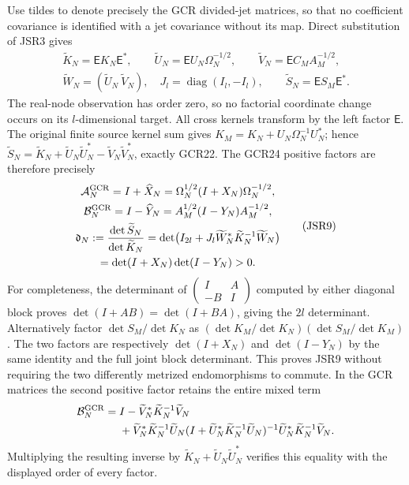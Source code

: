 \documentclass[11pt,a4paper]{article}
\newcommand{\diag}{\operatorname{diag}}
\begin{document}
Use tildes to denote precisely the GCR divided-jet matrices,
so that no coefficient covariance is identified with a jet
covariance without its map. Direct substitution of JSR3 gives
\[
\begin{gathered}
 \widetilde K_N=\mathsf E K_N\mathsf E^*,\qquad
 \widetilde U_N=\mathsf E U_N\Omega_N^{-1/2},\qquad
 \widetilde V_N=\mathsf E C_MA_M^{-1/2},\\
 \widetilde W_N=(\widetilde U_N\ \widetilde V_N),\quad
 J_l=\diag(I_l,-I_l),\qquad
 \widetilde S_N=\mathsf E S_M\mathsf E^*.
\end{gathered}\tag{JSR8}
\]
The real-node observation has order zero, so no factorial
coordinate change occurs on its $l$-dimensional target.
All cross kernels transform by the left factor $\mathsf E$.
The original finite source kernel sum gives
$K_M=K_N+U_N\Omega_N^{-1}U_N^*$; hence
$\widetilde S_N=\widetilde K_N+
\widetilde U_N\widetilde U_N^*-
\widetilde V_N\widetilde V_N^*$, exactly GCR22.
The GCR24 positive factors are therefore precisely
\[
\begin{gathered}
 \mathcal A_N^{\rm GCR}=I+\widehat X_N
      =\Omega_N^{1/2}(I+X_N)\Omega_N^{-1/2},\\
 \mathcal B_N^{\rm GCR}=I-\widehat Y_N
      =A_M^{1/2}(I-Y_N)A_M^{-1/2},\\
 \mathfrak d_N:=\frac{\det\widetilde S_N}{\det\widetilde K_N}
 =\det\bigl(I_{2l}+J_l\widetilde W_N^*
                  \widetilde K_N^{-1}\widetilde W_N\bigr)\\
 =\det(I+X_N)\det(I-Y_N)>0.
\end{gathered}\tag{JSR9}
\]
For completeness, the determinant of
$\left(\begin{smallmatrix}I&A\\-B&I\end{smallmatrix}\right)$
computed by either diagonal block proves
$\det(I+AB)=\det(I+BA)$, giving the $2l$ determinant.
Alternatively factor $\det S_M/\det K_N$ as
$(\det K_M/\det K_N)(\det S_M/\det K_M)$.
The two factors are respectively $\det(I+X_N)$ and
$\det(I-Y_N)$ by the same identity and the full joint
block determinant. This proves JSR9 without requiring
the two differently metrized endomorphisms to commute.
In the GCR matrices the second positive factor retains
the entire mixed term
\[
\begin{aligned}
 \mathcal B_N^{\rm GCR}={}&I-
 \widetilde V_N^*\widetilde K_N^{-1}\widetilde V_N\\
 &+\widetilde V_N^*\widetilde K_N^{-1}\widetilde U_N
 (I+\widetilde U_N^*\widetilde K_N^{-1}\widetilde U_N)^{-1}
 \widetilde U_N^*\widetilde K_N^{-1}\widetilde V_N.
\end{aligned}
\]
Multiplying the resulting inverse by
$\widetilde K_N+\widetilde U_N\widetilde U_N^*$ verifies
this equality with the displayed order of every factor.
\end{document}
